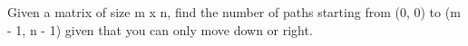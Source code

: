 \documentclass[preview]{standalone}
\begin{document}
\begin{center}
Given a matrix of size m x n, find the number of paths starting from (0, 0) to (m - 1, n - 1) given that you can only move down or right.
\end{center}
\end{document}

